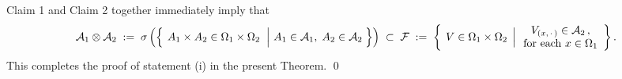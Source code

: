\vskip 0.5cm
\noindent
Claim 1 and Claim 2 together immediately imply that
\begin{equation*}
\mathcal{A}_{1} \otimes \mathcal{A}_{2}
\; := \;
\sigma\left(
\left\{\;
	\left.
	A_{1} \times A_{2} \overset{{\color{white}.}}{\in} \Omega_{1} \times \Omega_{2}
	\;\;\right\vert\,
	A_{1} \in \mathcal{A}_{1},\;
	A_{2} \in \mathcal{A}_{2}
	\;\right\}
\right)
\;\subset\;
	\mathcal{F}
\; := \;
	\left\{\;\left.
	V \overset{{\color{white}.}}{\in} \Omega_{1}\times\Omega_{2}
	\,\;\right\vert
	\begin{array}{c} V_{(x,\,\cdot\,)} \in \mathcal{A}_{2}\,,\\ \textnormal{for each $x\in\Omega_{1}$} \end{array}
	\right\}.
\end{equation*}
This completes the proof of statement (i) in the present Theorem.
\qed

\renewcommand{\theenumi}{\roman{enumi}}
\renewcommand{\labelenumi}{\textnormal{(\theenumi)}$\;\;$}

